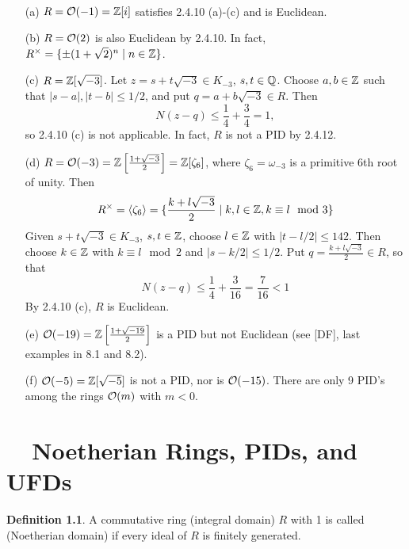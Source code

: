 \documentclass[11pt]{book}
\theoremstyle{definition}   \newtheorem{defn}[counter]{Definition} %
\newcommand{\gen}[1]{\langle #1 \rangle}   \newcommand{\stab}[2]{\tn{Stab}_{#1}(#2)}   \newcommand{\fix}[2]{\tn{Fix}_{#1}(#2)}
\newcommand{\vs}{\vspace{8pt}}
\numberwithin{counter}{chapter}
\begin{document}
\begin{example}
\
\begin{enumerate}
\item[(a)] $R = \mathcal{O}(-1) = \operatorname{\mathbb{Z}}[i]$ satisfies 2.4.10 (a)-(c) and is Euclidean.
\item[(b)] $R = \mathcal{O}(2)$ is also Euclidean by 2.4.10. In fact, $R^{\times} = \{\pm (1+\sqrt{2})^n \mid n \in \operatorname{\mathbb{Z}}\}$.
\item[(c)] $R = \operatorname{\mathbb{Z}}[\sqrt{-3}]$. Let $z = s + t \sqrt{-3} \in K_{-3}$, $s,t \in \operatorname{\mathbb{Q}}$. Choose $a,b \in \operatorname{\mathbb{Z}}$ such that $|s-a|,|t-b| \leq 1/2$, and put $q = a + b \sqrt{-3} \in R$. Then
	\[N(z-q) \leq \frac{1}{4} + \frac{3}{4} = 1, \]
so 2.4.10 (c) is not applicable. In fact, $R$ is not a PID by 2.4.12.

\item[(d)] $R = \mathcal{O}(-3) = \operatorname{\mathbb{Z}} \left[\frac{1+\sqrt{-3}}{2}\right] = \operatorname{\mathbb{Z}}[\zeta_6]$, where $\zeta_6 = \omega_{-3}$ is a primitive $6$th root of unity. Then
	\[R\x = \gen{\zeta_6} = \{\frac{k+l\sqrt{-3}}{2} \mid k,l \in \z, k \equiv l \mod{3}\} \]
Given $s+t\sqrt{-3} \in K_{-3}$, $s,t \in \operatorname{\mathbb{Z}}$, choose $l \in \operatorname{\mathbb{Z}}$ with $|t-l/2| \leq 142$. Then choose $k \in \operatorname{\mathbb{Z}}$ with $k \equiv l \mod{2}$ and $|s-k/2| \leq 1/2$. Put $q = \frac{k+l\sqrt{-3}}{2} \in R$, so that
\[N(z-q) \leq \frac{1}{4} + \frac{3}{16} = \frac{7}{16} < 1 \]
By 2.4.10 (c), $R$ is Euclidean.

\item[(e)] $\mathcal{O}(-19) = \operatorname{\mathbb{Z}} \left[\frac{1+\sqrt{-19}}{2}\right]$ is a PID but not Euclidean (see [DF], last examples in 8.1 and 8.2).

\item[(f)] $\mathcal{O}(-5) = \operatorname{\mathbb{Z}}[\sqrt{-5}]$ is not a PID, nor is $\mathcal{O}(-15)$. There are only 9 PID's among the rings $\mathcal{O}(m)$ with $m < 0$.
\end{enumerate}
\end{example}





\chapter{ \ \ Noetherian Rings, PIDs, and UFDs}

\begin{defn}
A commutative ring (integral domain) $R$ with 1 is called  (Noetherian domain) if every ideal of $R$ is finitely generated.
\end{defn}

\vs
\end{document}
